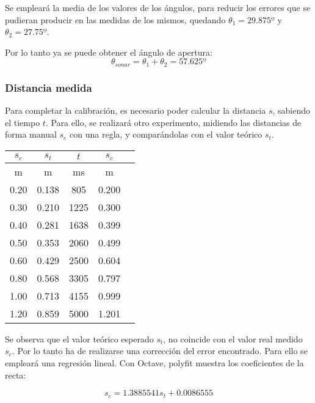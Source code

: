 \documentclass[10pt,a4paper,hidelinks]{article}
\begin{document}
\begin{multicols}{2}
Se empleará la media de los valores de los ángulos, para reducir los errores que
se pudieran producir en las medidas de los mismos, quedando $\theta_1 = 29.875
º$ y $\theta_2 = 27.75 º$.

Por lo tanto ya se puede obtener el ángulo de apertura:
$$\theta_{sonar} = \theta_1 + \theta_2 = 57.625 º $$

\subsubsection{Distancia medida}

Para completar la calibración, es necesario poder calcular la distancia $s$,
sabiendo el tiempo $t$. Para ello, se realizará otro experimento, midiendo las
distancias de forma manual $s_e$ con una regla, y comparándolas con el valor
teórico $s_t$.

\begin{center}
\begin{tabular}{ c | c | c | c | c }
\hline
$s_{e}$ & $s_{t}$ & $t$ & $s_{c}$\\ \hline
m & m & ms & m\\ \hline \hline
0.20 & 0.138 & 805  & 0.200 \\ \hline
0.30 & 0.210 & 1225 & 0.300 \\ \hline
0.40 & 0.281 & 1638 & 0.399 \\ \hline
0.50 & 0.353 & 2060 & 0.499 \\ \hline
0.60 & 0.429 & 2500 & 0.604 \\ \hline
0.80 & 0.568 & 3305 & 0.797 \\ \hline
1.00 & 0.713 & 4155 & 0.999 \\ \hline
1.20 & 0.859 & 5000 & 1.201 \\ \hline \hline
\end{tabular}
\end{center}

Se observa que el valor teórico esperado $s_t$, no coincide con el valor real
medido $s_e$. Por lo tanto ha de realizarse una corrección del error encontrado.
Para ello se empleará una regresión lineal. Con Octave, polyfit muestra los
coeficientes de la recta:

$$s_c = 1.3885541s_t + 0.0086555$$
\\


\end{multicols}
\end{document}
